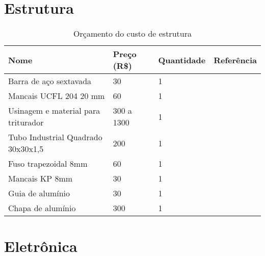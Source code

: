 \section{Estrutura}

\begin{table}[!ht]
\centering
\caption{Orçamento do custo de estrutura}
\label{my-label}
\begin{tabular}{|l|l|l|l|}
\hline
\textbf{Nome}                       & \textbf{Preço (R\$)} & \textbf{Quantidade} & \textbf{Referência} \\ \hline
Barra de aço sextavada              & 30                   & 1                   &                     \\ \hline
Mancais UCFL 204 20 mm              & 60                   & 1                   &                     \\ \hline
Usinagem e material para triturador & 300 a 1300           & 1                   &                     \\ \hline
Tubo Industrial Quadrado 30x30x1,5  & 200                  & 1                   &                     \\ \hline
Fuso trapezoidal 8mm                & 60                   & 1                   &                     \\ \hline
Mancais KP 8mm                      & 30                   & 1                   &                     \\ \hline
Guia de alumínio                    & 30                   & 1                   &                     \\ \hline
Chapa de alumínio                   & 300                  & 1                   &                     \\ \hline
\end{tabular}
\end{table}

\section{Eletrônica}

